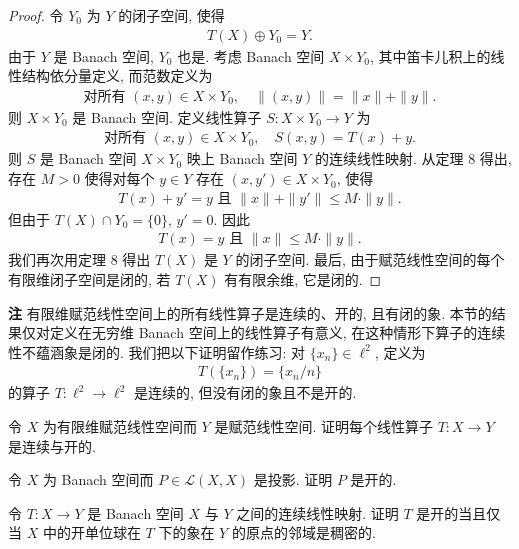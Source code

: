 \documentclass[../../main.tex]{subfiles}
\begin{document}
\begin{proof}
令 $Y_{0}$ 为 $Y$ 的闭子空间, 使得
\begin{align}
T(X)\oplus Y_{0}=Y.\label{align:ch13-直和Y}
\end{align}
由于 $Y$ 是 Banach 空间, $Y_{0}$ 也是. 考虑 Banach 空间 $X\times Y_{0}$, 其中笛卡儿积上的线性结构依分量定义, 而范数定义为
\begin{align*}
\text{对所有 }(x,y)\in X\times Y_{0},\quad\|(x,y)\|=\|x\|+\|y\|.
\end{align*}
则 $X\times Y_{0}$ 是 Banach 空间. 定义线性算子 $S:X\times Y_{0}\to Y$ 为
\begin{align*}
\text{对所有 }(x,y)\in X\times Y_{0},\quad S(x,y)=T(x)+y.
\end{align*}
则 $S$ 是 Banach 空间 $X\times Y_{0}$ 映上 Banach 空间 $Y$ 的连续线性映射. 从定理 8 得出, 存在 $M>0$ 使得对每个 $y\in Y$ 存在 $(x,y')\in X\times Y_{0}$, 使得
\begin{align*}
T(x)+y'=y\text{ 且 }\|x\|+\|y'\|\leqslant M\cdot\|y\|.
\end{align*}
但由于 $T(X)\cap Y_{0}=\{0\}$, $y'=0$. 因此
\begin{align*}
T(x)=y\text{ 且 }\|x\|\leqslant M\cdot\|y\|.
\end{align*}
我们再次用定理 8 得出 $T(X)$ 是 $Y$ 的闭子空间. 最后, 由于赋范线性空间的每个有限维闭子空间是闭的, 若 $T(X)$ 有有限余维, 它是闭的.
\end{proof}

\textbf{注} 有限维赋范线性空间上的所有线性算子是连续的、开的, 且有闭的象. 本节的结果仅对定义在无穷维 Banach 空间上的线性算子有意义, 在这种情形下算子的连续性不蕴涵象是闭的. 我们把以下证明留作练习: 对 $\{x_{n}\}\in\ell^{2}$, 定义为
\begin{align*}
T(\{x_{n}\})=\{x_{n}/n\}
\end{align*}
的算子 $T:\ell^{2}\to\ell^{2}$ 是连续的, 但没有闭的象且不是开的.

\begin{exercise}\label{exercise:ch13-29}
令 $X$ 为有限维赋范线性空间而 $Y$ 是赋范线性空间. 证明每个线性算子 $T:X\to Y$ 是连续与开的.
\end{exercise}

\begin{exercise}\label{exercise:ch13-30}
令 $X$ 为 Banach 空间而 $P\in\mathcal{L}(X,X)$ 是投影. 证明 $P$ 是开的.
\end{exercise}

\begin{exercise}\label{exercise:ch13-31}
令 $T:X\to Y$ 是 Banach 空间 $X$ 与 $Y$ 之间的连续线性映射. 证明 $T$ 是开的当且仅当 $X$ 中的开单位球在 $T$ 下的象在 $Y$ 的原点的邻域是稠密的.
\end{exercise}
\end{document}
